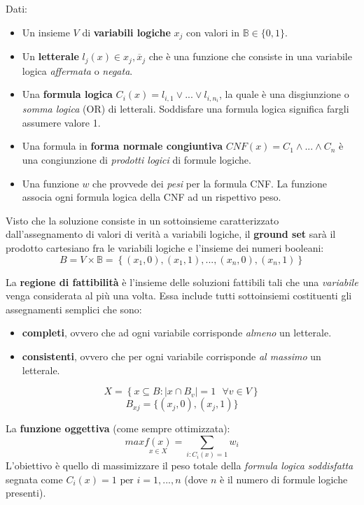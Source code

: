 \documentclass{article}
\begin{document}
Dati:
\begin{itemize}
    \item Un insieme $V$ di \textbf{variabili logiche} $x_j$ con valori in $\mathbb{B}\in \{0,1\}$.
    \item Un \textbf{letterale} $l_j(x)\in {x_j,\overline{x}_j}$ che è una funzione che consiste in una variabile logica
          \textit{affermata} o \textit{negata}.
    \item Una \textbf{formula logica} $C_i(x)=l_{i,1} \lor ... \lor l_{i,n_i}$, la quale è
          una disgiunzione o \textit{somma logica} (OR) di letterali. Soddisfare una formula
          logica significa fargli assumere valore 1.
    \item Una formula in \textbf{forma normale congiuntiva} $CNF(x)=C_1\land ... \land C_n$ è una congiunzione di \textit{prodotti logici} di formule logiche.
    \item Una funzione $w$ che provvede dei \textit{pesi} per la formula CNF. La funzione associa ogni formula logica
          della CNF ad un rispettivo peso.
\end{itemize}

Visto che la soluzione consiste in un sottoinsieme caratterizzato dall'assegnamento
di valori di verità a variabili logiche, il \textbf{ground set} sarà il prodotto cartesiano
fra le variabili logiche e l'insieme dei numeri booleani:
$$B=V\times\mathbb{B}=\left\{(x_1,0),(x_1,1),...,(x_n,0),(x_n,1)\right\}$$

La \textbf{regione di fattibilità} è l'insieme delle soluzioni fattibili tali che una \textit{variabile}
venga considerata al più una volta. Essa include tutti sottoinsiemi costituenti
gli assegnamenti semplici che sono:
\begin{itemize}
    \item \textbf{completi}, ovvero che ad ogni variabile corrisponde \textit{almeno} un letterale.
    \item \textbf{consistenti}, ovvero che per ogni variabile corrisponde \textit{al massimo} un letterale.
\end{itemize}

$$X=\left\{x\subseteq B : |x\cap B_v|=1 \text{ }\forall v \in V \right\}$$
$$B_{xj}=\{(x_j,0),(x_j,1)\}$$

La \textbf{funzione oggettiva} (come sempre ottimizzata):
$$max\underset{x\in X}{f(x)}=\sum_{i:C_i(x)=1}w_i$$
L'obiettivo è quello di massimizzare il peso totale della \textit{formula logica soddisfatta}
segnata come $C_i(x)=1 \text{ per } i=1,...,n$ (dove $n$ è il numero di formule logiche presenti).
\end{document}
